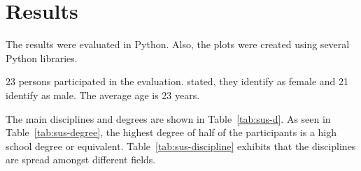 \section{Results}\label{section:eval-results}


\newcommand{\participantsCount}{23}
\newcommand{\participantsMale}{21}
\newcommand{\participantsAge}{23}

\newcommand{\evalExpMvAvgPoses}{2.83}
\newcommand{\evalExpMvStdPoses}{1.94}
\newcommand{\evalExpMvParticipants}{\participantsCount}

\newcommand{\kammAvgHits}{36.23/60}
\newcommand{\kammAvgStd}{6.87/60}
\newcommand{\youngAvgHits}{0.85}
\newcommand{\youngAvgStd}{-}
\newcommand{\oursAvgHits}{26.13/30}
\newcommand{\oursAvgStd}{5.52/30}

\newcommand{\evalExpMvSusScore}{83.04}
\newcommand{\evalExpMvSusGrade}{B}
\newcommand{\evalExpMvSusAdj}{\enquote{Good}}

\newcommand{\evalExpLpSusScore}{91.41}
\newcommand{\evalExpLpSusGrade}{A}
\newcommand{\evalExpLpSusAdj}{\enquote{Excellent}}

\newcommand{\evalExpVkSusScore}{71.63}
\newcommand{\evalExpVkSusGrade}{C}
\newcommand{\evalExpVkSusAdj}{\enquote{Ok}}

\newcommand{\participantsFemale}{\pgfmathparse{\participantsCount - \participantsMale}\pgfmathprintnumber[fixed, precision=2]{\pgfmathresult}}%

The results were evaluated in Python. Also, the plots were created using several Python libraries.

\participantsCount{} persons participated in the evaluation. \participantsFemale{} stated, they identify as female and \participantsMale{} identify as male. The average age is \participantsAge{} years.

The main disciplines and degrees are shown in Table~\ref{tab:sus-d}. As seen in Table~\ref{tab:sus-degree}, the highest degree of half of the participants is a high school degree or equivalent. Table~\ref{tab:sus-discipline} exhibits that the disciplines are spread amongst different fields.

